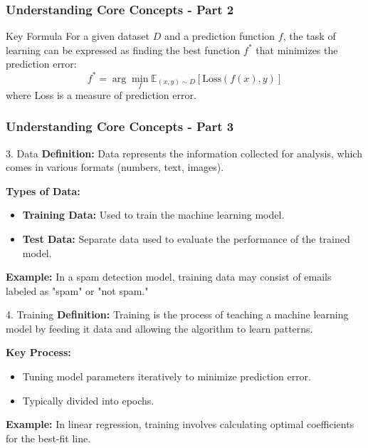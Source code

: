 \documentclass[aspectratio=169]{beamer}
\begin{document}
\begin{frame}[fragile]
    \frametitle{Understanding Core Concepts - Part 2}
    \begin{block}{Key Formula}
        For a given dataset \( D \) and a prediction function \( f \), the task of learning can be expressed as finding the best function \( f^* \) that minimizes the prediction error:
        \begin{equation}
            f^* = \arg\min_f \mathbb{E}_{(x,y) \sim D} \left[\text{Loss}(f(x), y)\right]
        \end{equation}
        where Loss is a measure of prediction error.
    \end{block}
\end{frame}

\begin{frame}[fragile]
    \frametitle{Understanding Core Concepts - Part 3}
    \begin{block}{3. Data}
        \textbf{Definition:}  
        Data represents the information collected for analysis, which comes in various formats (numbers, text, images).

        \textbf{Types of Data:}
        \begin{itemize}
            \item \textbf{Training Data:} Used to train the machine learning model.
            \item \textbf{Test Data:} Separate data used to evaluate the performance of the trained model.
        \end{itemize}
        
        \textbf{Example:} In a spam detection model, training data may consist of emails labeled as "spam" or "not spam."
    \end{block}

    \begin{block}{4. Training}
        \textbf{Definition:}  
        Training is the process of teaching a machine learning model by feeding it data and allowing the algorithm to learn patterns.

        \textbf{Key Process:}
        \begin{itemize}
            \item Tuning model parameters iteratively to minimize prediction error.
            \item Typically divided into epochs.
        \end{itemize}

        \textbf{Example:} In linear regression, training involves calculating optimal coefficients for the best-fit line.
    \end{block}
\end{frame}
\end{document}
